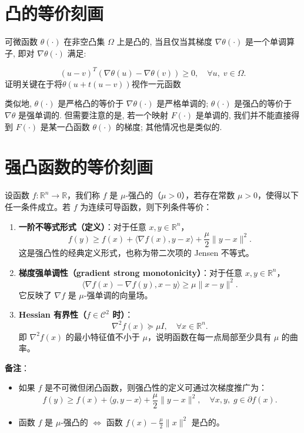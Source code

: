 \section{凸的等价刻画}
\begin{shaded}
可微函数 $\theta(\cdot)$ 在非空凸集 $\Omega$ 上是凸的, 当且仅当其梯度 $\nabla\theta(\cdot)$ 是一个单调算子, 即对 $\nabla\theta(\cdot)$ 满足:

$$
(u-v)^T(\nabla\theta(u)-\nabla\theta(v)) \geq 0, \quad \forall u,\; v \in \Omega.
$$ 
\alert{证明关键在于将$\theta(u+t(u-v))$视作一元函数}

类似地, $\theta(\cdot)$ 是严格凸的等价于 $\nabla\theta(\cdot)$ 是严格单调的; $\theta(\cdot)$ 是强凸的等价于 $\nabla\theta$ 是强单调的. 但需要注意的是, 若一个映射 $F(\cdot)$ 是单调的, 我们并不能直接得到 $F(\cdot)$ 是某一凸函数 $\theta(\cdot)$ 的梯度; 其他情况也是类似的.
\end{shaded}
\newpage
\section{强凸函数的等价刻画}

设函数 $f : \mathbb{R}^n \to \mathbb{R}$，我们称 $f$ 是 $\mu$-强凸的（$\mu > 0$），若存在常数 $\mu > 0$，使得以下任一条件成立。若 $f$ 为连续可导函数，则下列条件等价：

\begin{enumerate}
	\item \textbf{一阶不等式形式（定义）}：对于任意 $x, y \in \mathbb{R}^n$，
	\[
	f(y) \ge f(x) + \langle \nabla f(x), y - x \rangle + \frac{\mu}{2} \|y - x\|^2.
	\]
	这是强凸性的经典定义形式，也称为带二次项的 Jensen 不等式。
	
	\item \textbf{梯度强单调性（gradient strong monotonicity）}：对于任意 $x, y \in \mathbb{R}^n$，
	\[
	\langle \nabla f(x) - \nabla f(y), x - y \rangle \ge \mu \|x - y\|^2.
	\]
	它反映了 $\nabla f$ 是 $\mu$-强单调的向量场。
	
	\item \textbf{Hessian 有界性（$f \in \mathcal{C}^2$ 时）}：
	\[
	\nabla^2 f(x) \succeq \mu I, \quad \forall x \in \mathbb{R}^n.
	\]
	即 $\nabla^2 f(x)$ 的最小特征值不小于 $\mu$，说明函数在每一点局部至少具有 $\mu$ 的曲率。
\end{enumerate}

\textbf{备注}：
\begin{itemize}
	\item 如果 $f$ 是不可微但闭凸函数，则强凸性的定义可通过次梯度推广为：
	\[
	f(y) \ge f(x) + \langle g, y - x \rangle + \frac{\mu}{2} \|y - x\|^2, \quad \forall x,y,\; g \in \partial f(x).
	\]
	\item 函数 $f$ 是 $\mu$-强凸的 $\Leftrightarrow$ 函数 $f(x) - \frac{\mu}{2} \|x\|^2$ 是凸的。
\end{itemize}

